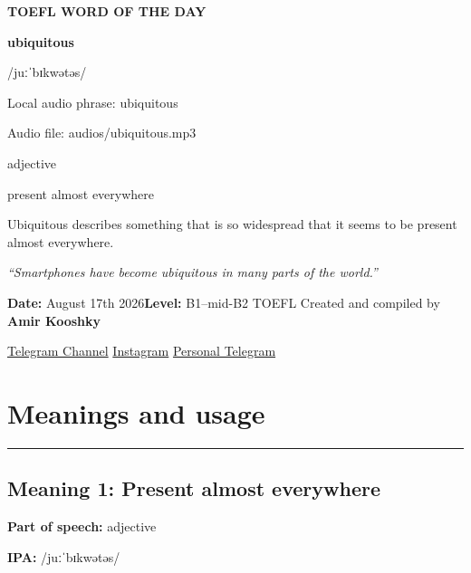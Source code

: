 \documentclass[11pt]{article}
\newcommand{\sectionrule}{\par\vspace{-0.5em}\noindent\textcolor{Accent}{\rule{\linewidth}{0.6pt}}\par}
\begin{document}
\begin{center}
{\sffamily\bfseries\color{Accent} TOEFL WORD OF THE DAY\par}
\vspace{8mm}
{\fontsize{42}{48}\selectfont\bfseries ubiquitous\par}
\vspace{2mm}
{\Large\sffamily\color{Accent} /juːˈbɪkwətəs/\par}
\vspace{2mm}
{\small\sffamily Local audio phrase: ubiquitous\par}
{\small\sffamily Audio file: audios/ubiquitous.mp3\par}
\vspace{2mm}
{\large\sffamily\color{Muted} adjective\par}
\vspace{5mm}
{\sffamily present almost everywhere\par}
\vspace{6mm}
{\large Ubiquitous describes something that is so widespread that it seems to be present almost everywhere.\par}
\vspace{6mm}
\begin{minipage}{0.84\textwidth}
\itshape “Smartphones have become ubiquitous in many parts of the world.”
\end{minipage}\par
\vspace{10mm}
\textbf{Date:} August 17th 2026\quad\textbullet\quad \textbf{Level:} B1--mid-B2 TOEFL
\vfill
Created and compiled by \textbf{Amir Kooshky}\par
\vspace{2mm}
\href{https://t.me/KooshkyTOEFL}{Telegram Channel}\quad\textbullet\quad
\href{https://www.instagram.com/kooshkytoefl}{Instagram}\quad\textbullet\quad
\href{https://t.me/KooshkyTOEFL\_pv}{Personal Telegram}
\end{center}
\newpage
\tableofcontents
\newpage

\section{Meanings and usage}
\sectionrule
\subsection{Meaning 1: Present almost everywhere}
\textbf{Part of speech:} adjective

\textbf{IPA:} /juːˈbɪkwətəs/
\end{document}
